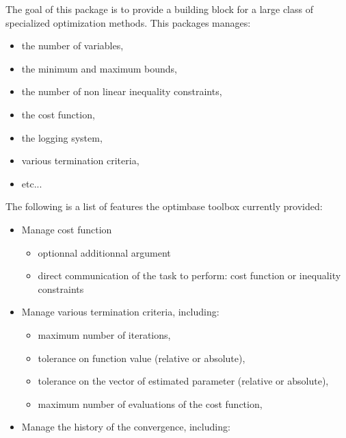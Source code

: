 %
\begin{Description}\relax
The goal of this package is to provide a building block for a large class of
specialized optimization methods. This packages manages: \begin{itemize}

\item the number of variables,
\item the minimum and maximum bounds,
\item the number of non linear inequality constraints,
\item the cost function,
\item the logging system,
\item various termination criteria,
\item etc...

\end{itemize}


The following is a list of features the optimbase toolbox currently provided:
\begin{itemize}

\item Manage cost function \begin{itemize}

\item optionnal additionnal argument
\item direct communication of the task to perform: cost function or
inequality  constraints

\end{itemize}

\item Manage various termination criteria, including: \begin{itemize}

\item maximum number of iterations,
\item tolerance on function value (relative or absolute),
\item tolerance on the vector of estimated parameter  (relative or
absolute),
\item maximum number of evaluations of the cost function,

\end{itemize}

\item Manage the history of the convergence, including: \begin{itemize}


\end{itemize}
\end{itemize}
\end{Description}
